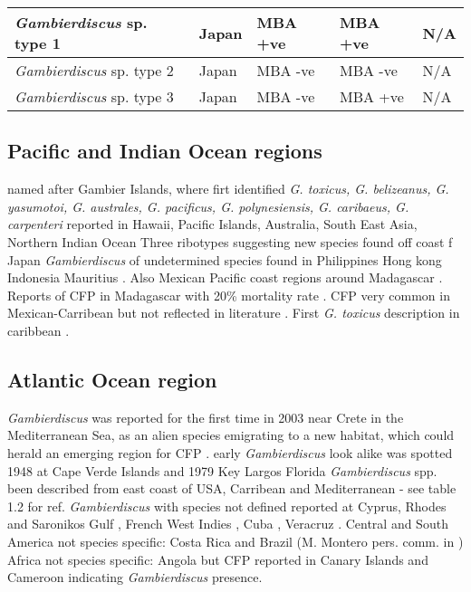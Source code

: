 \begin{landscape}
\begin{longtable}{ | p{2.5cm} | p{7cm} | p{3cm} | p{3cm} | p{3.5cm} | }
	\hline
	\emph{Gambierdiscus} sp. type 1 & Japan \cite{nishimura2013genetic} & MBA +ve \cite{nishimura2013genetic} & MBA +ve \cite{nishimura2013genetic} & N/A \\
	\hline
	\emph{Gambierdiscus} sp. type 2 & Japan \cite{nishimura2013genetic} & MBA -ve \cite{nishimura2013genetic} & MBA -ve \cite{nishimura2013genetic} & N/A \\
	\hline
	\emph{Gambierdiscus} sp. type 3 & Japan \cite{nishimura2013genetic} & MBA -ve \cite{nishimura2013genetic} & MBA +ve \cite{nishimura2013genetic} & N/A \\
	\hline
	\end{longtable}
	\end{landscape}
	\FloatBarrier
\subsection{Pacific and Indian Ocean regions}
named after Gambier Islands, where firt identified \cite{adachi1979thecal}
\emph{G. toxicus, G. belizeanus, G. yasumotoi, G. australes, G. pacificus, G. polynesiensis, G. caribaeus, G. carpenteri} reported in Hawaii, Pacific Islands, Australia, South East Asia, Northern Indian Ocean %
Three ribotypes suggesting new species found off coast f Japan \cite{nishimura2013genetic}
\emph{Gambierdiscus} of undetermined species found in Philippines \cite{gillespie1987possible} Hong kong \cite{lu2004harmful} Indonesia \cite{praseno1996hab} Mauritius \cite{hurbungs2002seasonal}. Also Mexican Pacific coast \cite{ceballos2006analisis} regions around Madagascar \cite{grzebyk1994ecology}. 
Reports of CFP in Madagascar with 20\% mortality rate \cite{habermehl1994severe}. CFP very common in Mexican-Carribean but not reflected in literature \cite{hernandez2004species}.
First \emph{G. toxicus} description in caribbean \cite{besada1982observations}.

\subsection{Atlantic Ocean region}
\emph{Gambierdiscus} was reported for the first time in 2003 near Crete in the Mediterranean Sea, as an alien species emigrating to a new habitat, which could herald an emerging region for CFP \cite{aligizaki2008morphological}.
early \emph{Gambierdiscus} look alike was spotted 1948 at Cape Verde Islands \cite{silva1956contribution} and 1979 Key Largos Florida \cite{taylor1979description}
\emph{Gambierdiscus} spp. been described from east coast of USA, Carribean and Mediterranean - see table 1.2 for ref.
\emph{Gambierdiscus} with species not defined reported at Cyprus, Rhodes and Saronikos Gulf \cite{aligizaki2009toxic,aligizaki2010diversity}, French West Indies \cite{lobel1988assessment}, Cuba \cite{delgado2006epiphytic}, Veracruz \cite{okolodkov2007seasonal}.
Central and South America not species specific: Costa Rica and Brazil (M. Montero pers. comm. in \cite{parsons2012gambierdiscus})
Africa not species specific: Angola \cite{berdalet2012global} but CFP reported in Canary Islands and Cameroon \cite{bienfang2008ciguatera} indicating \emph{Gambierdiscus} presence.

